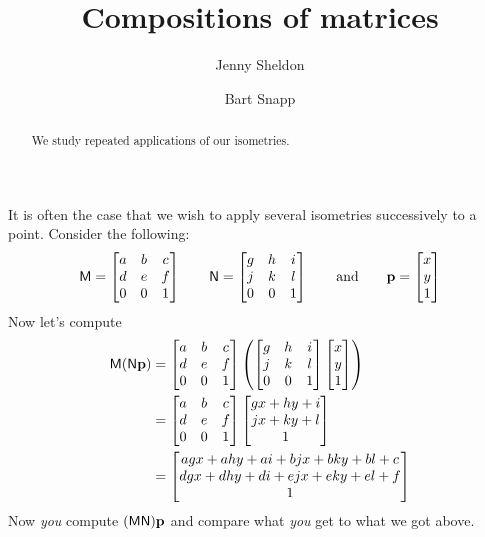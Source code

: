 \documentclass{ximera}
\author{Jenny Sheldon \and Bart Snapp}
\title{Compositions of matrices}
\begin{document}
\begin{abstract}
  We study repeated applications of our isometries.
\end{abstract}
\maketitle


It is often the case that we wish to apply several isometries
successively to a point. Consider the following:
\[
\mathsf{M} =
\begin{bmatrix}
a & b & c\\
d & e & f \\
0 & 0 & 1
\end{bmatrix}
\qquad
\mathsf{N} =
\begin{bmatrix}
g & h & i\\
j & k & l\\
0 & 0 & 1
\end{bmatrix}
\qquad\text{and}\qquad \mathbf{p} =
\begin{bmatrix}
x \\
y \\
1
\end{bmatrix}
\]
Now let's compute 
\begin{align*}
\mathsf{M}(\mathsf{N}\mathbf{p}) &= \begin{bmatrix}
a & b & c\\
d & e & f \\
0 & 0 & 1
\end{bmatrix} 
\left(
\begin{bmatrix}
g & h & i\\
j & k & l\\
0 & 0 & 1
\end{bmatrix}
\begin{bmatrix}
x \\
y \\
1
\end{bmatrix}
\right)\\
&= 
\begin{bmatrix}
a & b & c\\
d & e & f \\
0 & 0 & 1
\end{bmatrix} 
\begin{bmatrix}
gx+hy + i\\
jx+ky +l\\
1
\end{bmatrix} \\
&=
\begin{bmatrix}
agx+ahy +ai + bjx+bky+bl+c\\
dgx+dhy+ di + ejx+eky+el+f\\
1
\end{bmatrix}
\end{align*}
Now \textit{you} compute $(\mathsf{M}\mathsf{N})\mathbf{p}$ and compare what
\textit{you} get to what we got above.
\end{document}
